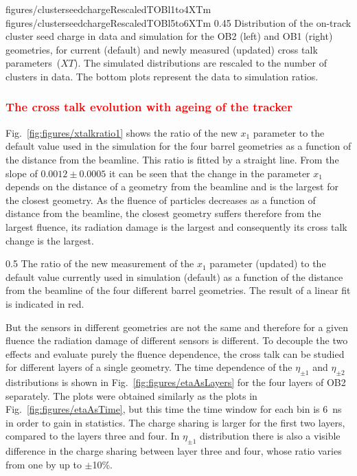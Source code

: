                  {figures/clusterseedchargeRescaledTOBl1to4XTm} %
                 {figures/clusterseedchargeRescaledTOBl5to6XTm} %
                 {0.45}       %
                 { Distribution of the on-track cluster seed charge in data and simulation for the OB2 (left) and OB1 (right) geometries, for current (default) and newly measured (updated) cross talk parameters~($XT$).  The simulated distributions are rescaled to the number of clusters in data.  The bottom plots represent the data to simulation ratios. }


\subsubsection{\textcolor{red}{The cross talk evolution with ageing of the tracker}}

Fig.~\ref{fig:figures/xtalkratio1} shows the ratio of  the new $x_{1}$ parameter to the default value used in the simulation for the four barrel geometries as a function of the distance from the beamline. This ratio is fitted by a straight line. From the slope of $0.0012 \pm 0.0005$ it can be seen that the change in the parameter $x_{1}$ depends on the distance of a geometry from the beamline and is the largest for the closest geometry. As the fluence of particles decreases as a function of distance from the beamline, the closest geometry suffers therefore from the largest fluence, its radiation damage is the largest and consequently its cross talk change is the largest.  


                 {0.5}       %
                 {The ratio of the new measurement of the $x_{1}$ parameter (updated) to the default value currently used in simulation (default) as a function of the distance from the beamline of the four different barrel geometries. The result of a linear fit is indicated in red. }

But the sensors in different geometries are not the same and therefore for a given fluence the radiation damage of different sensors is different. To decouple the two effects and evaluate purely the fluence dependence, the cross talk can be studied for different layers of a single geometry. The time dependence of the $\eta_{\pm 1}$ and $\eta_{\pm 2}$ distributions is shown in Fig.~\ref{fig:figures/etaAsLayers} for the four layers of OB2 separately. The plots were obtained similarly as the plots in Fig.~\ref{fig:figures/etaAsTime}, but this time the time window for each bin is 6~ns in order to gain in statistics. The charge sharing is larger for the first two layers, compared to the layers three and four. In  $\eta_{\pm 1}$ distribution there is also a visible difference in the charge sharing between layer three and four, whose ratio varies from one by up to $\pm$10\%. 

